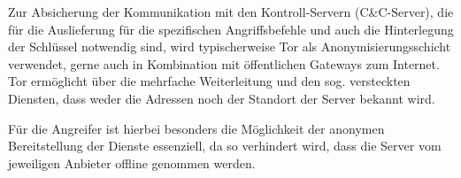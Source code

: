 Zur Absicherung der Kommunikation mit den Kontroll-Servern (C\&C-Server), die für die Auslieferung für die spezifischen Angriffsbefehle und auch die Hinterlegung der Schlüssel notwendig sind, wird typischerweise Tor als Anonymisierungsschicht verwendet, gerne auch in Kombination mit öffentlichen Gateways zum Internet. \\
Tor ermöglicht über die mehrfache Weiterleitung und den sog. versteckten Diensten, dass weder die Adressen noch der Standort der Server bekannt wird. \cite{tor:hidden}

Für die Angreifer ist hierbei besonders die Möglichkeit der anonymen Bereitstellung der Dienste essenziell, da so verhindert wird, dass die Server vom jeweiligen Anbieter offline genommen werden.
